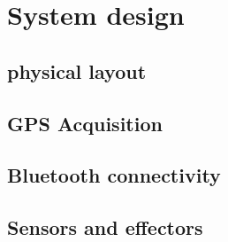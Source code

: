\section{System design}

\subsection{physical layout}

\subsection{GPS Acquisition}

\subsection{Bluetooth connectivity}

\subsection{Sensors and effectors}
